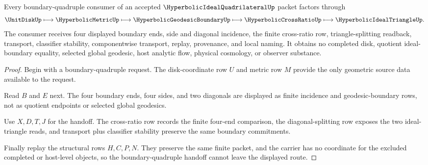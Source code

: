 \begin{theorem}
\label{thm:hyperbolic-ideal-quadrilateral-boundary-quadruple-handoff}
Every boundary-quadruple consumer of an accepted $\HyperbolicIdealQuadrilateralUp$ packet factors through
$$
\UnitDiskUp \longmapsto \HyperbolicMetricUp \longmapsto \HyperbolicGeodesicBoundaryUp \longmapsto \HyperbolicCrossRatioUp \longmapsto \HyperbolicIdealTriangleUp .
$$
The consumer receives four displayed boundary ends, side and diagonal incidence, the finite cross-ratio row, triangle-splitting readback, transport, classifier stability, componentwise transport, replay, provenance, and local naming. It obtains no completed disk, quotient ideal-boundary equality, selected global geodesic, host analytic flow, physical cosmology, or observer substance.
\end{theorem}
\begin{proof}
Begin with a boundary-quadruple request. The disk-coordinate row $U$ and metric row $M$ provide the only geometric source data available to the request.

Read $B$ and $E$ next. The four boundary ends, four sides, and two diagonals are displayed as finite incidence and geodesic-boundary rows, not as quotient endpoints or selected global geodesics.

Use $X,D,T,J$ for the handoff. The cross-ratio row records the finite four-end comparison, the diagonal-splitting row exposes the two ideal-triangle reads, and transport plus classifier stability preserve the same boundary commitments.

Finally replay the structural rows $H,C,P,N$. They preserve the same finite packet, and the carrier has no coordinate for the excluded completed or host-level objects, so the boundary-quadruple handoff cannot leave the displayed route.
\end{proof}



